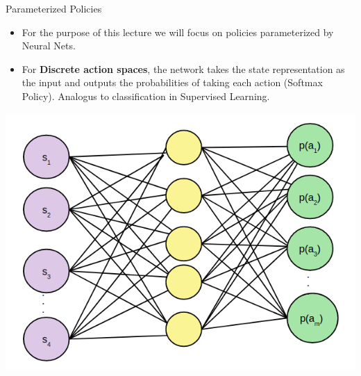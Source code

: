 \begin{frame}{Parameterized Policies}
\begin{itemize}
    \item For the purpose of this lecture we will focus on policies parameterized by Neural Nets.
    \item For \textbf{Discrete action spaces}, the network takes the state representation as the input and outputs the probabilities of taking each action (Softmax Policy). Analogus to classification in Supervised Learning.
\end{itemize}
\begin{center}
\includegraphics[scale=0.3]{img/discaction.png}
\end{center}
\end{frame}
